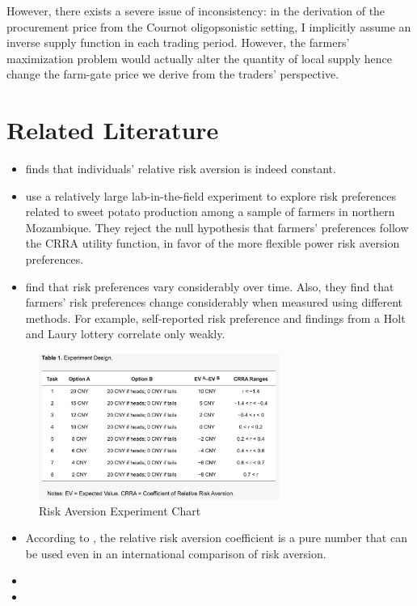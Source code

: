 \documentclass[12pt]{article}
\begin{document}
However, there exists a severe issue of inconsistency: in the derivation of the procurement price from the Cournot oligopsonistic setting, I implicitly assume an inverse supply function in each trading period. However, the farmers' maximization problem would actually alter the quantity of local supply hence change the farm-gate price we derive from the traders' perspective. 




\section{Related Literature}
\begin{itemize}
    \item \cite{chiappori2011relative} finds that individuals’ relative risk aversion is indeed constant. 
    
    \item \cite{de2014measuring} use a relatively large lab-in-the-field experiment to explore risk preferences related to sweet potato production among a sample of farmers in northern Mozambique. They reject the null hypothesis that farmers' preferences follow the CRRA utility function, in favor of the more flexible power risk aversion preferences. 

    \item \cite{finger2023stability} find that risk preferences vary considerably over time. Also, they find that farmers' risk preferences change considerably when measured using different methods. For example, self-reported risk preference and findings from a Holt and Laury lottery correlate only weakly. 
    
\end{itemize}

\begin{figure}[ht]
    \centering
    \includegraphics[width=0.7\textwidth]{figures/RA_experiment_chart.png}
    \caption{Risk Aversion Experiment Chart}
    \label{fig:Risk Aversion Experiment Chart}
\end{figure}


\begin{itemize}
    \item According to \cite{hardaker2000some}, the relative risk aversion coefficient is a pure number that can be used even in an international comparison of risk aversion.
    
    \item 
    \item 
\end{itemize}

\newpage

\end{document}
